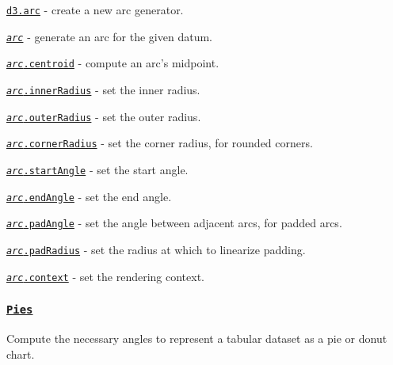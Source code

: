 \begin{DoxyItemize}
\item \href{https://github.com/d3/d3-shape/blob/master/README.md#arc}{\tt d3.\+arc} -\/ create a new arc generator.
\item \href{https://github.com/d3/d3-shape/blob/master/README.md#_arc}{\tt {\itshape arc}} -\/ generate an arc for the given datum.
\item \href{https://github.com/d3/d3-shape/blob/master/README.md#arc_centroid}{\tt {\itshape arc}.centroid} -\/ compute an arc’s midpoint.
\item \href{https://github.com/d3/d3-shape/blob/master/README.md#arc_innerRadius}{\tt {\itshape arc}.inner\+Radius} -\/ set the inner radius.
\item \href{https://github.com/d3/d3-shape/blob/master/README.md#arc_outerRadius}{\tt {\itshape arc}.outer\+Radius} -\/ set the outer radius.
\item \href{https://github.com/d3/d3-shape/blob/master/README.md#arc_cornerRadius}{\tt {\itshape arc}.corner\+Radius} -\/ set the corner radius, for rounded corners.
\item \href{https://github.com/d3/d3-shape/blob/master/README.md#arc_startAngle}{\tt {\itshape arc}.start\+Angle} -\/ set the start angle.
\item \href{https://github.com/d3/d3-shape/blob/master/README.md#arc_endAngle}{\tt {\itshape arc}.end\+Angle} -\/ set the end angle.
\item \href{https://github.com/d3/d3-shape/blob/master/README.md#arc_padAngle}{\tt {\itshape arc}.pad\+Angle} -\/ set the angle between adjacent arcs, for padded arcs.
\item \href{https://github.com/d3/d3-shape/blob/master/README.md#arc_padRadius}{\tt {\itshape arc}.pad\+Radius} -\/ set the radius at which to linearize padding.
\item \href{https://github.com/d3/d3-shape/blob/master/README.md#arc_context}{\tt {\itshape arc}.context} -\/ set the rendering context.
\end{DoxyItemize}

\subsubsection*{\href{https://github.com/d3/d3-shape/blob/master/README.md#pies}{\tt Pies}}

Compute the necessary angles to represent a tabular dataset as a pie or donut chart.


